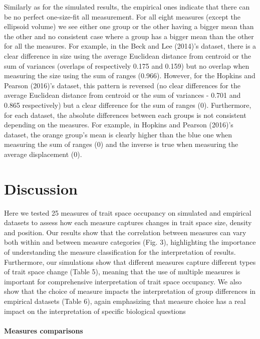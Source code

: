 \documentclass[]{article}
\let\oldparagraph\paragraph
\renewcommand{\paragraph}[1]{\oldparagraph{#1}\mbox{}}
\begin{document}
Similarly as for the simulated results, the empirical ones indicate that
there can be no perfect one-size-fit all measurement. For all eight
measures (except the ellipsoid volume) we see either one group or the
other having a bigger mean than the other and no consistent case where a
group has a bigger mean than the other for all the measures. For
example, in the Beck and Lee (2014)'s dataset, there is a clear
difference in size using the average Euclidean distance from centroid or
the sum of variances (overlaps of respectively 0.175 and 0.159) but no
overlap when measuring the size using the sum of ranges (0.966).
However, for the Hopkins and Pearson (2016)'s dataset, this pattern is
reversed (no clear differences for the average Euclidean distance from
centroid or the sum of variances - 0.701 and 0.865 respectively) but a
clear difference for the sum of ranges (0). Furthermore, for each
dataset, the absolute differences between each groups is not consistent
depending on the measures. For example, in Hopkins and Pearson (2016)'s
dataset, the orange group's mean is clearly higher than the blue one
when measuring the sum of ranges (0) and the inverse is true when
measuring the average displacement (0).

\section{Discussion}\label{discussion}

Here we tested 25 measures of trait space occupancy on simulated and
empirical datasets to assess how each measure captures changes in trait
space size, density and position. Our results show that the correlation
between measures can vary both within and between measure categories
(Fig. 3), highlighting the importance of understanding the measure
classification for the interpretation of results. Furthermore, our
simulations show that different measures capture different types of
trait space change (Table 5), meaning that the use of multiple measures
is important for comprehensive interpretation of trait space occupancy.
We also show that the choice of measure impacts the interpretation of
group differences in empirical datasets (Table 6), again emphasizing
that measure choice has a real impact on the interpretation of specific
biological questions

\paragraph{Measures comparisons}\label{measures-comparisons}
\end{document}
